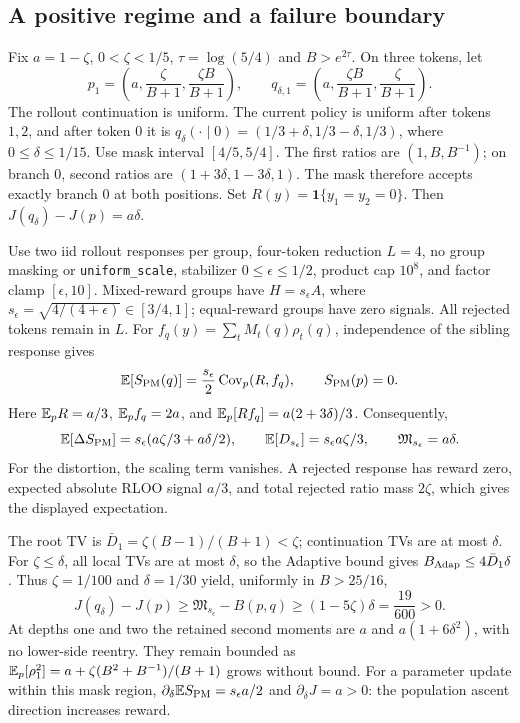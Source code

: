 \subsection{A positive regime and a failure boundary}
\begin{example}
\label{ex:selective-positive-margin}
Fix $a=1-\zeta$, $0<\zeta<1/5$, $\tau=\log(5/4)$ and
$B>e^{2\tau}$. On three tokens, let
\[
 p_1=\left(a,\frac{\zeta}{B+1},\frac{\zeta B}{B+1}\right),\qquad
 q_{\delta,1}=\left(a,\frac{\zeta B}{B+1},\frac{\zeta}{B+1}\right).
\]
The rollout continuation is uniform. The current policy is uniform after
tokens $1,2$, and after token $0$ it is
$q_\delta(\cdot\mid0)=(1/3+\delta,1/3-\delta,1/3)$,
where $0\le\delta\le1/15$. Use mask interval $[4/5,5/4]$.
The first ratios are $(1,B,B^{-1})$; on branch $0$, second ratios are
$(1+3\delta,1-3\delta,1)$. The mask therefore accepts exactly branch $0$
at both positions. Set $R(y)=\mathbf1\{y_1=y_2=0\}$.
Then $J(q_\delta)-J(p)=a\delta$.

Use two iid rollout responses per group, four-token reduction $L=4$,
no group masking or \texttt{uniform\_scale}, stabilizer
$0\le\epsilon\le1/2$, product cap $10^8$, and factor clamp $[\epsilon,10]$.
Mixed-reward groups have $H=s_\epsilon A$, where
$s_\epsilon=\sqrt{4/(4+\epsilon)}\in[3/4,1]$;
equal-reward groups have zero signals. All rejected tokens remain in $L$.
For $f_q(y)=\sum_tM_t(q)\rho_t(q)$, independence of the sibling response gives
\[
 \mathbb{E}[S_{\rm PM}(q)]=\frac{s_\epsilon}{2}\operatorname{Cov}_p(R,f_q),
 \qquad S_{\rm PM}(p)=0.
\]
Here $\mathbb{E}_pR=a/3$, $\mathbb{E}_pf_q=2a$, and
$\mathbb{E}_p[Rf_q]=a(2+3\delta)/3$. Consequently,
\[
 \mathbb{E}[\Delta S_{\rm PM}]=s_\epsilon(a\zeta/3+a\delta/2),\qquad
 \mathbb{E}[D_{s_\epsilon}]=s_\epsilon a\zeta/3,
 \qquad \mathfrak M_{s_\epsilon}=a\delta.
\]
For the distortion, the scaling term vanishes. A rejected response has
reward zero, expected absolute RLOO signal $a/3$, and total rejected
ratio mass $2\zeta$, which gives the displayed expectation.

The root TV is $\bar D_1=\zeta(B-1)/(B+1)<\zeta$;
continuation TVs are at most $\delta$. For $\zeta\le\delta$, all local
TVs are at most $\delta$, so the Adaptive bound gives
$B_{\rm Adap}\le4\bar D_1\delta$.
Thus $\zeta=1/100$ and $\delta=1/30$ yield, uniformly in $B>25/16$,
\[
 J(q_\delta)-J(p)\ge\mathfrak M_{s_\epsilon}-B(p,q)
 \ge(1-5\zeta)\delta=\frac{19}{600}>0.
\]
At depths one and two the retained second moments are $a$ and
$a(1+6\delta^2)$, with no lower-side reentry. They remain bounded as
$\mathbb{E}_p[\rho_1^2]=a+\zeta(B^2+B^{-1})/(B+1)$ grows without bound.
For a parameter update within this mask region,
$\partial_\delta\mathbb{E} S_{\rm PM}=s_\epsilon a/2$ and
$\partial_\delta J=a>0$: the population ascent direction increases reward.
\end{example}

